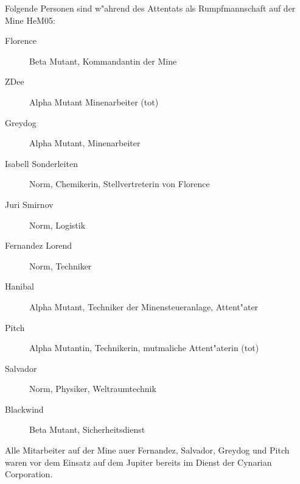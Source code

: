 
Folgende Personen sind w"ahrend des Attentats als Rumpfmannschaft auf der Mine HeM05:

\begin{description}
    \item[Florence] Beta Mutant, Kommandantin der Mine    
    \item[ZDee] Alpha Mutant Minenarbeiter (tot)
    \item[Greydog] Alpha Mutant, Minenarbeiter
    \item[Isabell Sonderleiten] Norm, Chemikerin, Stellvertreterin von Florence
    \item[Juri Smirnov] Norm, Logistik
    \item[Fernandez Lorend] Norm, Techniker
    \item[Hanibal] Alpha Mutant, Techniker der Minensteueranlage, Attent"ater
    \item[Pitch] Alpha Mutantin, Technikerin, mutma\3liche Attent"aterin (tot)
    \item[Salvador] Norm, Physiker, Weltraumtechnik
    \item[Blackwind] Beta Mutant, Sicherheitsdienst
\end{description}

Alle Mitarbeiter auf der Mine au\3er Fernandez, Salvador, Greydog und Pitch waren vor dem Einsatz auf dem Jupiter bereits im Dienst der Cynarian Corporation.